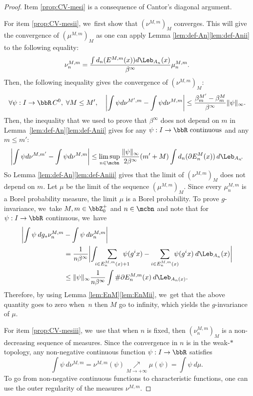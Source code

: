 \begin{proof}
Item \eqref{prop:CV-mesi} is a consequence of Cantor's diagonal argument.

For item \eqref{prop:CV-mesii}, we~first show that $(\nu^{M,m})_M$ converges. This will give the convergence of $(\mu^{M,m})_M$ as one can apply Lemma \ref{lem:def-An}\eqref{lem:def-Anii} to the following equality:
\[
\nu_n^{M,m} = \frac{\int d_n(E^{M,m}(x)) d\Leb_{A_n}(x)}{\beta^{\infty}} \mu_n^{M,m}.
\]
Then, the following inequality gives the convergence of $(\nu^{M,m})_M$:
\[
\forall \psi : I \rightarrow \bbR \,C^0,\; \forall M \leq M',\quad
\left|\int \psi d \nu^{M',m} - \int \psi d \nu^{M,m}\right|
\leq \frac{\beta_m^{M'} - \beta_m^M}{\beta^{\infty}} \| \psi \|_{\infty}.
\]
Then, the inequality that we used to prove that $\beta^{\infty}$ does not depend on $m$ in Lem\-ma~\ref{lem:def-An}\eqref{lem:def-Anii} gives for any $\psi : I \to \bbR \text{ continuous}$ and any $m \leq m'$:
\[
\left | \int \psi d \nu^{M,m'} - \int \psi d \nu^{M,m} \right | \leq \limsup_{n \in \mcbn} \frac{\| \psi \|_{\infty}}{2 \beta^{\infty}} (m' + M) \int d_n(\partial E_n^M(x))\, d \Leb_{A_n}\!.
\]
So Lemma \ref{lem:def-An}\eqref{lem:def-Aniii} gives that the limit of $(\nu^{M,m})_M$ does not depend on $m$.
Let $\mu$ be the limit of the sequence $(\mu^{M,m})_M$. Since every $\mu_n^{M,m}$ is a Borel probability measure, the limit $\mu$ is a Borel probability. To prove $g$-invariance, we~take $M,m \in \bbZ_0^+$ and $n \in \mcbn$ and note that for $\psi : I \to \bbR$ continuous, we~have
\begin{align*}
\biggl | \int \psi \: d g_* \nu_n^{M,m} &- \int \psi \: d \nu_n^{M,m} \biggr |\\
&= \frac{1}{n \beta^{\infty} }\biggl | \int \hspace{-2mm} \sum_{i \in E_n^{M,m}(x)+1}\hspace{-4mm} \psi(g^i x) - \sum_{i \in E_n^{M,m}(x)} \hspace{-3mm}\psi(g^i x) \: d \Leb_{A_n}(x) \biggr |\\
&\leq \| \psi \|_{\infty} \frac{1}{n \beta^{\infty} } \int \# \partial E_n^{M,m}(x) \: d\Leb_{A_n(x)}.
\end{align*}
Therefore, by using Lemma \ref{lem:EnM}\eqref{lem:EnMii}, we~get that the above quantity goes to zero when~$n$ then $M$ go to infinity, which yields the $g$-invariance of $\mu$.

For item \eqref{prop:CV-mesiii}, we~use that when $n$ is fixed, then $(\nu_n^{M,m})_M$ is a non-decreasing sequence of measures. Since the convergence in $n$ is in the weak\nobreakdash-$*$ topology, any non-negative continuous function $\psi : I \to \bbR$ satisfies
\[
\int \psi \: d \nu^{M,m} =\nu^{M,m}(\psi) \!\underset{M \to +\infty}{\nearrow}\! \mu(\psi) = \int \psi \: d \mu.
\]
To go from non-negative continuous functions to characteristic functions, one can use the outer regularity of the measures $\nu^{M,m}$.
\end{proof}


